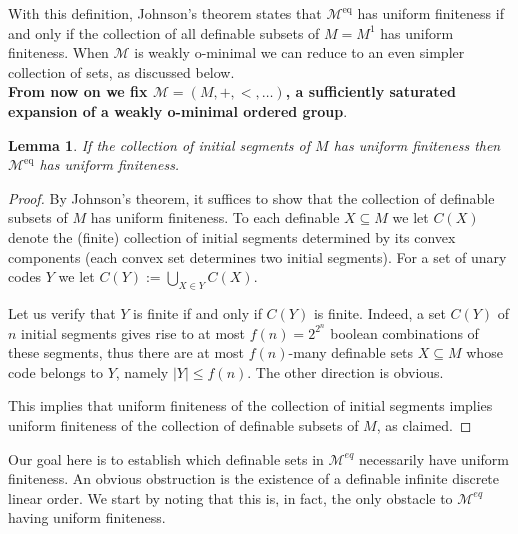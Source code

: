 \documentclass[11pt]{amsart}
\DeclareMathOperator{\eq}{eq}
\newtheorem{lemma}[theorem]{Lemma}
\theoremstyle{definition}
\newcommand{\CM}{{\mathcal M}}
\newcommand{\0}{\emptyset}
\def\sub{\subseteq}
\begin{document}
With this definition, Johnson's theorem \cite[Theorem 2.3]{JohnUF} states  that $\CM^{\eq}$ has uniform finiteness if and only if the collection of all definable subsets of $M=M^1$ has uniform finiteness. When $\CM$ is weakly o-minimal we can reduce to an even simpler collection of sets, as discussed below.  \\


\textbf{From now on we fix  $\CM=(M,+,<,\dots)$, a sufficiently saturated expansion of a weakly o-minimal ordered group}. 

\begin{lemma}\label{L: initial segments}
   If the collection of initial segments  of $M$ has uniform finiteness then $\CM^{\eq}$ has uniform finiteness.
\end{lemma}
\begin{proof}
By Johnson's theorem, it suffices to show that the collection of definable subsets of $M$ has uniform finiteness. To each definable $X\sub M$ we let $C(X)$ denote the (finite) collection  of 
initial  segments  determined by its convex components (each convex set determines two initial segments).  For a set of unary codes $Y$ we let $C(Y):=\bigcup\limits_{X\in Y} C(X)$. 

Let us verify that $Y$ is finite if and only if $C(Y)$ is finite. Indeed, a set $C(Y)$ of $n$ initial segments gives rise to at most $f(n)=2^{2^n}$ boolean combinations of these segments, thus there are at most $f(n)$-many definable sets $X\sub M$ whose code belongs to $Y$, namely $|Y|\leq f(n)$. The other direction is obvious. 

This implies that uniform finiteness of the collection of initial segments implies uniform finiteness of the collection of definable subsets of $M$, as claimed. 
\end{proof}


Our goal here is to establish which  definable sets in $\CM^{eq}$ necessarily have uniform finiteness.
An obvious obstruction  is the existence of a definable infinite discrete linear order. We start by noting that this is, in fact, the only obstacle to $\CM^{eq}$ having uniform finiteness. 
\end{document}
